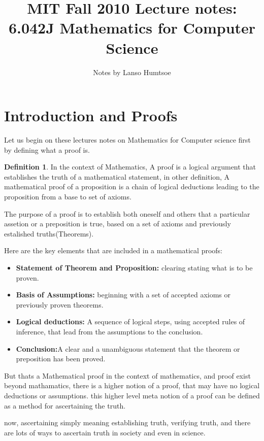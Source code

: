 \documentclass{article}
\theoremstyle{definition}
\newtheorem{definition}{Definition}
\begin{document}
\title{MIT Fall 2010 Lecture notes: 6.042J Mathematics for Computer Science }
\author{Notes by Lanso Humtsoe}
\maketitle
\section{Introduction and Proofs}

Let us begin on these lectures notes on Mathematics for Computer science first by defining what a proof is. 

\begin{definition}
In the context of Mathematics, A proof is a logical argument that establishes the truth of a mathematical statement, in other definition, A mathematical proof of a proposition is a chain of logical deductions leading to the proposition from a base to set of axioms.
\end{definition}
 The purpose of a proof is to establish both oneself and others that a particular assetion or a preposition is     true, based on a set of axioms and previously estalished truths(Theorems). 

 Here are the key elements that are included in a mathematical proofs:

\begin{itemize}
  \item \textbf{Statement of Theorem and Proposition:} clearing stating what is to be proven.
  \item \textbf{Basis of Assumptions:} beginning with a set of accepted axioms or previously proven theorems. 
  \item \textbf{Logical deductions:} A sequence of logical steps, using accepted rules of inference, that lead from the assumptions to the conclusion.
  \item \textbf{Conclusion:}A clear and a unambiguous statement that the theorem or preposition has been proved.
\end{itemize}

But thats a Mathematical proof in the context of mathematics, and proof exist beyond mathamatics, there is a higher notion of a proof, that may have no logical deductions or assumptions.
this higher level meta notion of a proof can be defined as a method for ascertaining the truth.

now, ascertaining simply meaning establishing truth, verifying truth, and there are lots of ways to ascertain truth in society and even in science.
\end{document}
